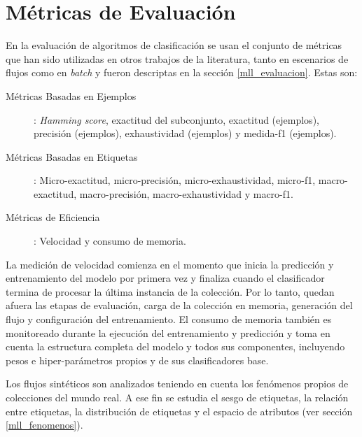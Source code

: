 \section{Métricas de Evaluación}

En la evaluación de algoritmos de clasificación se usan el conjunto de métricas
que han sido utilizadas en otros trabajos de la literatura, tanto en escenarios
de flujos \cite{sousa_multi-label_2018, zheng_survey_2020,
	osojnik_multi-label_2017} como en \textit{batch} \cite{madjarov_extensive_2012,
	zhang_multi-label_2010, gibaja_tutorial_2015} y fueron descriptas en la
sección \ref{mll_evaluacion}. Estas son:

\begin{description}

	\item[Métricas Basadas en Ejemplos]: \textit{Hamming score}, exactitud del
	      subconjunto, exactitud (ejemplos), precisión (ejemplos), exhaustividad
	      (ejemplos) y medida-f1 (ejemplos).

	\item[Métricas Basadas en Etiquetas]: Micro-exactitud, micro-precisión,
	      micro-exhaustividad, micro-f1, macro-exactitud, macro-precisión,
	      macro-exhaustividad y macro-f1.

	\item[Métricas de Eficiencia]: Velocidad y consumo de memoria.

\end{description}

La medición de velocidad comienza en el momento que inicia la predicción y
entrenamiento del modelo por primera vez y finaliza cuando el clasificador
termina de procesar la última instancia de la colección. Por lo tanto, quedan
afuera las etapas de evaluación, carga de la colección en memoria, generación
del flujo y configuración del entrenamiento. El consumo de memoria también es
monitoreado durante la ejecución del entrenamiento y predicción y toma en cuenta
la estructura completa del modelo y todos sus componentes, incluyendo pesos e
hiper-parámetros propios y de sus clasificadores base.

Los flujos sintéticos son analizados teniendo en cuenta los fenómenos propios de
colecciones del mundo real. A ese fin se estudia el sesgo de etiquetas, la
relación entre etiquetas, la distribución de etiquetas y el espacio de atributos
(ver sección \ref{mll_fenomenos}). 

